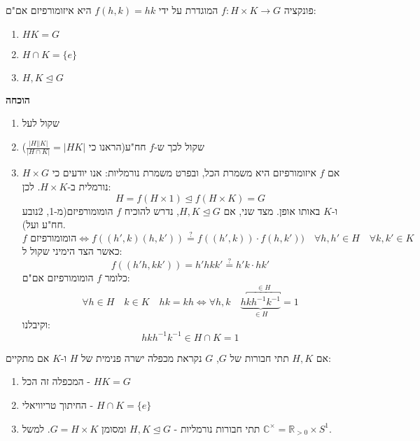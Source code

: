 \documentclass{tstextbook}
\begin{document}
\begin{proposition}
פונקציה \(f:H\times K \to G\) המוגדרת על ידי \(f(h,k)=hk\) היא איזומורפיזם אם"ם:

  \begin{enumerate}
    \item \(HK=G\)


    \item \(H\cap K=\{ e \}\)


    \item \(H,K\trianglelefteq G\)


  \end{enumerate}
\end{proposition}
\textbf{הוכחה}

\begin{enumerate}
  \item שקול לעל 


  \item שקול לכך ש-\(f\) חח"ע(הראנו כי \(\frac{|H||K|}{|H\cap K|}=|HK|\)) 


  \item אם \(f\) איזומורפיזם היא משמרת הכל, ובפרט משמרת נורמליות: 
אנו יודעים כי \(H\times G\) נורמלית ב-\(H\times K\). לכן:
$$H=f\left( H\times 1 \right)\trianglelefteq f\left( H\times K \right)=G$$
ו-\(K\) באותו אופן. 
מצד שני, אם \(H,K\trianglelefteq G\), נדרש להוכיח \(f\) הומומורפיזם(מ-1, 2נובע חח"ע ועל).
$$f\text{ הומומורפיזם}\iff f((h',k)(h,k'))\stackrel{?}{=} f((h',k))\cdot f(h,k')) \quad \forall h,h'\in H\quad \forall k,k'\in K$$
כאשר הצד הימיני שקול ל:
$$f((h'h,kk'))=h'hkk'\stackrel{?}{=} h'k \cdot hk'$$
כלומר \(f\) הומומורפיזם אם"ם:
$$\forall h\in H\quad k\in K\quad hk=kh \iff \forall h,k\quad \underbrace{ h\overbracket{ kh^{-1}k^{-1} }^{ \in H } }_{ \in H } =1$$
וקיבלנו: 
$$hkh^{-1} k^{-1}  \in H\cap K=1$$


\end{enumerate}
\begin{definition}
אם \(H,K\) תתי חבורות של \(G\), \(G\) נקראת מכפלה ישרה פנימית של \(H\) ו-\(K\) אם מתקיים:

  \begin{enumerate}
    \item המכפלה זה הכל - \(HK=G\)


    \item החיתוך טריוויאלי - \(H\cap K=\{ e \}\)


    \item תתי חבורות נורמליות - \(H,K \trianglelefteq G\) 
ומסומן \(G=H\times K\). למשל \(\mathbb{C} ^\times =\mathbb{R} _{>0}\times S^1\).


  \end{enumerate}
\end{definition}
\end{document}

